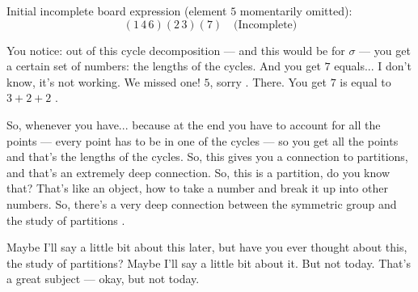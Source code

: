 \begin{content}
\begin{center}
\end{center}

Initial incomplete board expression (element $5$ momentarily omitted):
\[
(1\,4\,6)(2\,3)(7) \quad \text{(Incomplete)}
\]
\end{content}

\begin{hidden}
\end{hidden}

\begin{speech}[00:31:21 - 00:32:34]
You notice: out of this cycle decomposition --- and this would be for $\sigma$  --- you get a certain set of numbers: the lengths of the cycles. And you get $7$ equals...  I don't know, it's not working. We missed one! $5$, sorry . There. You get $7$ is equal to $3 + 2 + 2$ .

So, whenever you have... because at the end you have to account for all the points --- every point has to be in one of the cycles --- so you get all the points and that's the lengths of the cycles. So, this gives you a connection to partitions, and that's an extremely deep connection. So, this is a partition, do you know that? That's like an object, how to take a number and break it up into other numbers. So, there's a very deep connection between the symmetric group and the study of partitions .

Maybe I'll say a little bit about this later, but have you ever thought about this, the study of partitions? Maybe I'll say a little bit about it. But not today. That's a great subject --- okay, but not today.
\end{speech}

